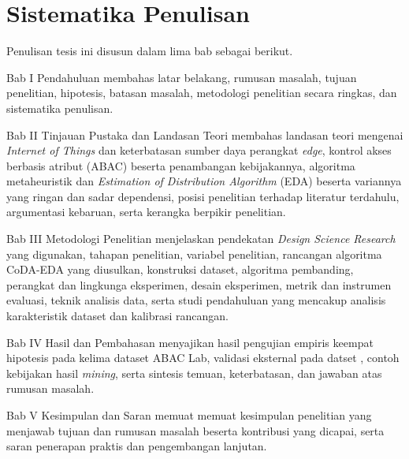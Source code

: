 \section{Sistematika Penulisan}

Penulisan tesis ini disusun dalam lima bab sebagai berikut.

Bab I Pendahuluan membahas latar belakang, rumusan masalah, tujuan penelitian, hipotesis, batasan masalah, metodologi penelitian secara ringkas, dan sistematika penulisan.

Bab II Tinjauan Pustaka dan Landasan Teori membahas landasan teori mengenai \textit{Internet of Things} dan keterbatasan sumber daya perangkat \textit{edge}, kontrol akses berbasis atribut (ABAC) beserta penambangan kebijakannya, algoritma metaheuristik dan \textit{Estimation of Distribution Algorithm} (EDA) beserta variannya yang ringan dan sadar dependensi, posisi penelitian terhadap literatur terdahulu, argumentasi kebaruan, serta kerangka berpikir penelitian.

Bab III Metodologi Penelitian menjelaskan pendekatan \textit{Design Science Research} yang digunakan, tahapan penelitian, variabel penelitian, rancangan algoritma CoDA-EDA yang diusulkan, konstruksi dataset, algoritma pembanding, perangkat dan lingkunga eksperimen, desain eksperimen, metrik dan instrumen evaluasi, teknik analisis data, serta studi pendahuluan yang mencakup analisis karakteristik dataset dan kalibrasi rancangan.

Bab IV Hasil dan Pembahasan menyajikan hasil pengujian empiris keempat hipotesis pada kelima dataset ABAC Lab, validasi eksternal pada datset , contoh kebijakan hasil \textit{mining}, serta sintesis temuan, keterbatasan, dan jawaban atas rumusan masalah.

Bab V Kesimpulan dan Saran memuat memuat kesimpulan penelitian yang menjawab tujuan dan rumusan masalah beserta kontribusi yang dicapai, serta saran penerapan praktis dan pengembangan lanjutan.